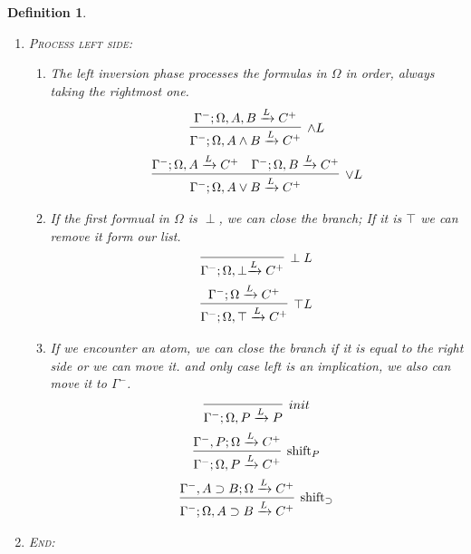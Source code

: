 \documentclass{article}
\theoremstyle{plain}
\newtheorem{definition}[theorem]{Definition}
\newcounter{case}
\theoremstyle{nonumberplain}
\begin{document}
\begin{definition}
\begin{enumerate}
\begin{enumerate}
		$$
		\begin{gathered}
		\infer[\text{LR}_\vee]{\Gamma^-; \Omega \xrightarrow{R} A \vee B}{\Gamma^-; \Omega \xrightarrow{L} A \vee B} \\
		\infer[\text{LR}_\perp]{\Gamma^-; \Omega \xrightarrow{R} \perp}{\Gamma^-; \Omega \xrightarrow{L} \perp}
		\end{gathered}
		$$
	\end{enumerate}
	\item \textsc{Process left side}:
	\begin{enumerate}
		\item The left inversion phase processes the formulas in $\Omega$ in order, always taking the rightmost one. 
		$$
		\begin{gathered}
		\infer[\wedge L]{\Gamma^-; \Omega, A\wedge B \xrightarrow{L} C^+}{\Gamma^-; \Omega, A, B \xrightarrow{L}C^+}\\
		\infer[\vee L]{\Gamma^-; \Omega, A \vee B \xrightarrow{L} C^+}{\Gamma^-; \Omega,A \xrightarrow{L} C^+& \Gamma^-; \Omega,B \xrightarrow{L} C^+}
		\end{gathered}
		$$
		\item If the first formual in $\Omega$ is $\perp$, we can close the branch; If it is $\top$ we can  remove it form our list.
		$$
		\begin{gathered}
		\infer[\perp L]{\Gamma^-; \Omega,\perp \xrightarrow{L} C^+}{} \\
		\infer[\top L]{\Gamma^-; \Omega, \top \xrightarrow{L} C^+}{\Gamma^-; \Omega  \xrightarrow{L} C^+}
		\end{gathered}
		$$
		\item If we encounter an atom, we can close the branch if it is equal to the right side or we can move it. and only case left is an implication, we also can move it to $\Gamma^-$. 
		$$
		\begin{gathered}
		\infer[init]{\Gamma^-; \Omega,P \xrightarrow{L} P}{} \\
		\infer[\text{shift}_P]{\Gamma^-; \Omega,P \xrightarrow{L} C^+}{\Gamma^-, P; \Omega \xrightarrow{L} C^+} \\
		\infer[\text{shift}_\supset]{\Gamma^-; \Omega,A \supset B \xrightarrow{L} C^+}{\Gamma^-,A \supset B; \Omega \xrightarrow{L} C^+} \\
		\end{gathered}
		$$
	\end{enumerate}
	\item \textsc{End}: 
	\begin{enumerate}

\end{enumerate}
\end{enumerate}
\end{definition}
\end{document}
